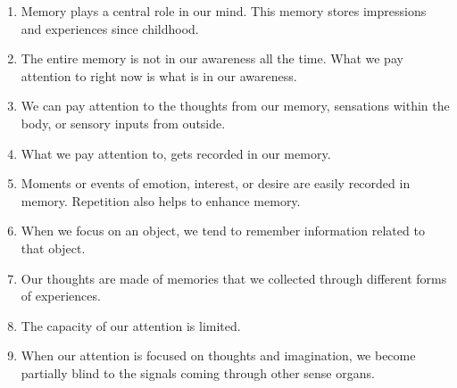 \documentclass[reprint,amsmath,amssymb,apr,aip,onecolumn, 11pt]{revtex4-1}
\begin{document}
	\begin{enumerate}
		\item Memory plays a central role in our mind. This memory stores impressions and experiences since childhood. 
		
		\item	The entire memory is not in our awareness all the time. What we pay attention to right now is what is in our awareness. 
		
		\item	We can pay attention to the thoughts from our memory,  sensations within the body, or sensory inputs from outside.
		
		\item	What we pay attention to, gets recorded in our memory.  
		
		\item	Moments or events of emotion, interest, or desire are easily recorded in memory. Repetition also helps to enhance memory.
		
		\item When we  focus on an object, we tend to remember information related to that object.  
		
		\item	Our thoughts are made of memories that we collected through different forms of experiences. 
		
		\item	The capacity of our attention is limited. 
		
		\item  When our attention is focused on thoughts and imagination, we become partially blind to the signals coming through other sense organs.
		
		
	 	
	 	
	 	
	 \end{enumerate}
	
\end{document}
